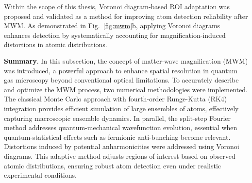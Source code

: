 Within the scope of this thesis, Voronoi diagram-based ROI adaptation was proposed and validated as a method for improving atom detection reliability after MWM. As demonstrated in Fig.~\ref{fig:mwm}b, applying Voronoi diagrams enhances detection by systematically accounting for magnification-induced distortions in atomic distributions. 


\textbf{Summary}. In this subsection, the concept of matter-wave magnification (MWM) was introduced, a powerful approach to enhance spatial resolution in quantum gas microscopy beyond conventional optical limitations.
To accurately describe and optimize the MWM process, two numerical methodologies were implemented. The classical Monte Carlo approach with fourth-order Runge-Kutta (RK4) integration provides efficient simulation of large ensembles of atoms, effectively capturing macroscopic ensemble dynamics. In parallel, the split-step Fourier method addresses quantum-mechanical wavefunction evolution, essential when quantum-statistical effects such as fermionic anti-bunching become relevant. Distortions induced by potential anharmonicities were addressed using Voronoi diagrams. This adaptive method adjusts regions of interest based on observed atomic distributions, ensuring robust atom detection even under realistic experimental conditions.

